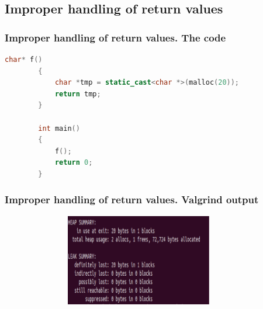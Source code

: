 \documentclass[10pt,xcolor={usenames,dvipsnames}]{beamer}
\begin{document}
\subsection{Improper handling of return values}

\begin{frame}[fragile]
\frametitle{Improper handling of return values. The code} 
	\begin{center}
		\begin{lstlisting}[language=C++]
		char* f()
		{
			char *tmp = static_cast<char *>(malloc(20));
			return tmp;
		}

		int main()
		{
			f();
			return 0;
		}
		\end{lstlisting}
	\end{center}
\end{frame}
\begin{frame}[fragile]
	\frametitle{Improper handling of return values. Valgrind output}
	\begin{center}
		\begin{figure}
			\includegraphics[height=4cm,width=10cm]{improper_handling_of_return_values.png}
		\end{figure}
	\end{center}
\end{frame}
\end{document}
